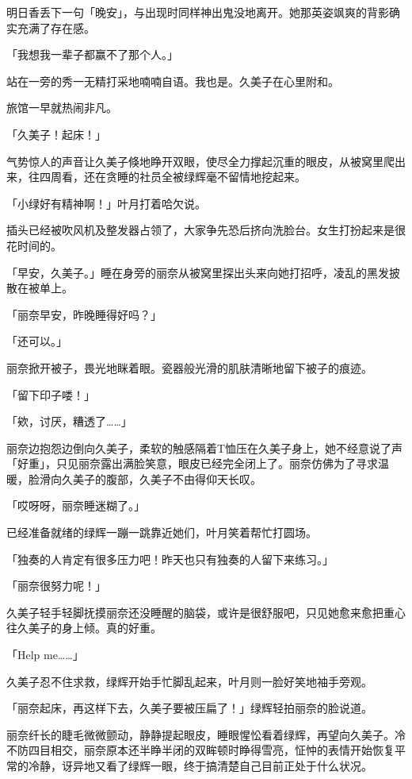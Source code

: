 \documentclass[UTF8]{ctexart}
\begin{document}
    明日香丢下一句「晚安」，与出现时同样神出鬼没地离开。她那英姿飒爽的背影确实充满了存在感。 

    「我想我一辈子都赢不了那个人。」 

    站在一旁的秀一无精打采地喃喃自语。我也是。久美子在心里附和。 

    旅馆一早就热闹非凡。 

    「久美子！起床！」 

    气势惊人的声音让久美子倏地睁开双眼，使尽全力撑起沉重的眼皮，从被窝里爬出来，往四周看，还在贪睡的社员全被绿辉毫不留情地挖起来。 

    「小绿好有精神啊！」叶月打着哈欠说。 

    插头已经被吹风机及整发器占领了，大家争先恐后挤向洗脸台。女生打扮起来是很花时间的。 

    「早安，久美子。」睡在身旁的丽奈从被窝里探出头来向她打招呼，凌乱的黑发披散在被单上。 

    「丽奈早安，昨晚睡得好吗？」 

    「还可以。」 

    丽奈掀开被子，畏光地眯着眼。瓷器般光滑的肌肤清晰地留下被子的痕迹。 

    「留下印子喽！」 

    「欸，讨厌，糟透了……」 

    丽奈边抱怨边倒向久美子，柔软的触感隔着T恤压在久美子身上，她不经意说了声「好重」，只见丽奈露出满脸笑意，眼皮已经完全闭上了。丽奈仿佛为了寻求温暖，脸滑向久美子的腹部，久美子不由得仰天长叹。 

    「哎呀呀，丽奈睡迷糊了。」 

    已经准备就绪的绿辉一蹦一跳靠近她们，叶月笑着帮忙打圆场。 

    「独奏的人肯定有很多压力吧！昨天也只有独奏的人留下来练习。」 

    「丽奈很努力呢！」 

    久美子轻手轻脚抚摸丽奈还没睡醒的脑袋，或许是很舒服吧，只见她愈来愈把重心往久美子的身上倾。真的好重。 

    「Help me……」 

    久美子忍不住求救，绿辉开始手忙脚乱起来，叶月则一脸好笑地袖手旁观。 

    「丽奈起床，再这样下去，久美子要被压扁了！」绿辉轻拍丽奈的脸说道。 

    丽奈纤长的睫毛微微颤动，静静提起眼皮，睡眼惺忪看着绿辉，再望向久美子。冷不防四目相交，丽奈原本还半睁半闭的双眸顿时睁得雪亮，怔忡的表情开始恢复平常的冷静，讶异地又看了绿辉一眼，终于搞清楚自己目前正处于什么状况。 
\end{document}
